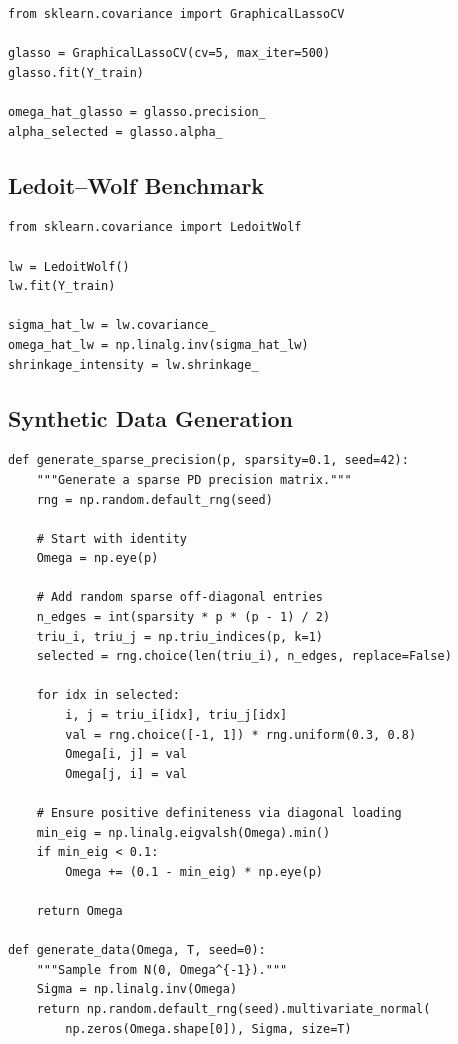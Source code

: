 \documentclass[11pt,a4paper]{article}
\begin{document}
\begin{lstlisting}[caption={Graphical lasso via scikit-learn.}]
from sklearn.covariance import GraphicalLassoCV

glasso = GraphicalLassoCV(cv=5, max_iter=500)
glasso.fit(Y_train)

omega_hat_glasso = glasso.precision_
alpha_selected = glasso.alpha_
\end{lstlisting}

\subsection{Ledoit--Wolf Benchmark}

\begin{lstlisting}[caption={Ledoit--Wolf shrinkage estimator.}]
from sklearn.covariance import LedoitWolf

lw = LedoitWolf()
lw.fit(Y_train)

sigma_hat_lw = lw.covariance_
omega_hat_lw = np.linalg.inv(sigma_hat_lw)
shrinkage_intensity = lw.shrinkage_
\end{lstlisting}

\subsection{Synthetic Data Generation}

\begin{lstlisting}[caption={Generating data with known sparse precision matrix.}]
def generate_sparse_precision(p, sparsity=0.1, seed=42):
    """Generate a sparse PD precision matrix."""
    rng = np.random.default_rng(seed)

    # Start with identity
    Omega = np.eye(p)

    # Add random sparse off-diagonal entries
    n_edges = int(sparsity * p * (p - 1) / 2)
    triu_i, triu_j = np.triu_indices(p, k=1)
    selected = rng.choice(len(triu_i), n_edges, replace=False)

    for idx in selected:
        i, j = triu_i[idx], triu_j[idx]
        val = rng.choice([-1, 1]) * rng.uniform(0.3, 0.8)
        Omega[i, j] = val
        Omega[j, i] = val

    # Ensure positive definiteness via diagonal loading
    min_eig = np.linalg.eigvalsh(Omega).min()
    if min_eig < 0.1:
        Omega += (0.1 - min_eig) * np.eye(p)

    return Omega

def generate_data(Omega, T, seed=0):
    """Sample from N(0, Omega^{-1})."""
    Sigma = np.linalg.inv(Omega)
    return np.random.default_rng(seed).multivariate_normal(
        np.zeros(Omega.shape[0]), Sigma, size=T)
\end{lstlisting}
\end{document}
